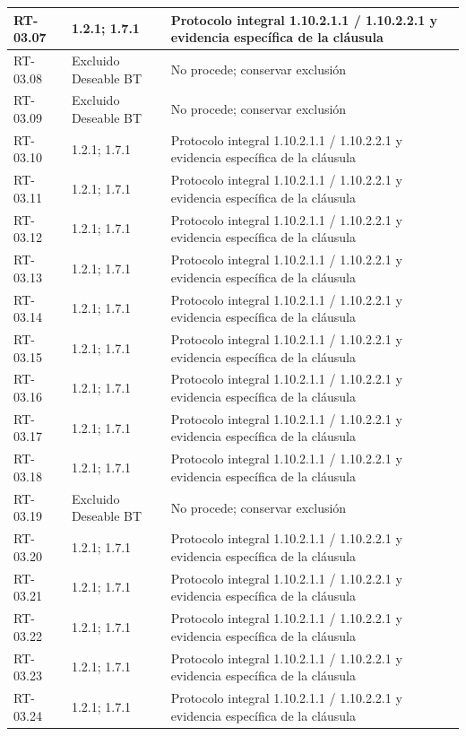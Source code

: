 \begin{longtable}{L{23mm}L{46mm}L{72mm}}
RT-03.07 & 1.2.1; 1.7.1 & Protocolo integral 1.10.2.1.1 / 1.10.2.2.1 y evidencia específica de la cláusula\\\hline
RT-03.08 & Excluido Deseable BT & No procede; conservar exclusión\\\hline
RT-03.09 & Excluido Deseable BT & No procede; conservar exclusión\\\hline
RT-03.10 & 1.2.1; 1.7.1 & Protocolo integral 1.10.2.1.1 / 1.10.2.2.1 y evidencia específica de la cláusula\\\hline
RT-03.11 & 1.2.1; 1.7.1 & Protocolo integral 1.10.2.1.1 / 1.10.2.2.1 y evidencia específica de la cláusula\\\hline
RT-03.12 & 1.2.1; 1.7.1 & Protocolo integral 1.10.2.1.1 / 1.10.2.2.1 y evidencia específica de la cláusula\\\hline
RT-03.13 & 1.2.1; 1.7.1 & Protocolo integral 1.10.2.1.1 / 1.10.2.2.1 y evidencia específica de la cláusula\\\hline
RT-03.14 & 1.2.1; 1.7.1 & Protocolo integral 1.10.2.1.1 / 1.10.2.2.1 y evidencia específica de la cláusula\\\hline
RT-03.15 & 1.2.1; 1.7.1 & Protocolo integral 1.10.2.1.1 / 1.10.2.2.1 y evidencia específica de la cláusula\\\hline
RT-03.16 & 1.2.1; 1.7.1 & Protocolo integral 1.10.2.1.1 / 1.10.2.2.1 y evidencia específica de la cláusula\\\hline
RT-03.17 & 1.2.1; 1.7.1 & Protocolo integral 1.10.2.1.1 / 1.10.2.2.1 y evidencia específica de la cláusula\\\hline
RT-03.18 & 1.2.1; 1.7.1 & Protocolo integral 1.10.2.1.1 / 1.10.2.2.1 y evidencia específica de la cláusula\\\hline
RT-03.19 & Excluido Deseable BT & No procede; conservar exclusión\\\hline
RT-03.20 & 1.2.1; 1.7.1 & Protocolo integral 1.10.2.1.1 / 1.10.2.2.1 y evidencia específica de la cláusula\\\hline
RT-03.21 & 1.2.1; 1.7.1 & Protocolo integral 1.10.2.1.1 / 1.10.2.2.1 y evidencia específica de la cláusula\\\hline
RT-03.22 & 1.2.1; 1.7.1 & Protocolo integral 1.10.2.1.1 / 1.10.2.2.1 y evidencia específica de la cláusula\\\hline
RT-03.23 & 1.2.1; 1.7.1 & Protocolo integral 1.10.2.1.1 / 1.10.2.2.1 y evidencia específica de la cláusula\\\hline
RT-03.24 & 1.2.1; 1.7.1 & Protocolo integral 1.10.2.1.1 / 1.10.2.2.1 y evidencia específica de la cláusula\\\hline

\end{longtable}
